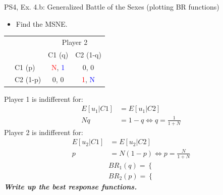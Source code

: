\begin{frame}{PS4, Ex. 4.b: Generalized Battle of the Sexes (plotting BR functions)}
  \begin{multicols}{2}
    \begin{itemize}
      \item[(b)] Find the MSNE.
    \end{itemize}
    \vspace{-8pt}
    \begin{table}
      \begin{tabular}{cl|c|c|}
          & \multicolumn{1}{c}{} & \multicolumn{2}{c}{\color{blue}Player 2}\\
          \parbox[t]{1mm}{}
          &  &  &  \\
          & C1 (p)    & \textcolor{red}{N}, \textcolor{blue}{1} & 0, 0 \\
          & C2 (1-p)  & 0, 0 & \textcolor{red}{1}, \textcolor{blue}{N} \\
      \end{tabular}
    \end{table}
    Player 1 is indifferent for:
    \begin{align*}
      E[u_1|C1]&=E[u_1|C2]\\
      Nq &= 1-q \Leftrightarrow q = \frac{1}{1+N}
    \end{align*}
    Player 2 is indifferent for:
    \begin{align*}
      E[u_2|C1]&=E[u_2|C2]\\
      p &= N(1-p) \Leftrightarrow p = \frac{N}{1+N}
    \end{align*}
    \begin{align*}
      BR_1(q)=\left\{\right. \\
      BR_2(p)=\left\{\right.
    \end{align*}
  \vfill\null \columnbreak
    \textbf{\textit{Write up the best response functions.}}
  \vfill\null
  \end{multicols}
\end{frame}
